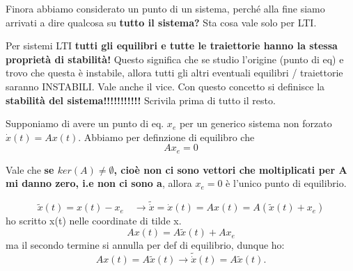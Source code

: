 \documentclass[a4paper]{report}
\begin{document}
\bb
Finora abbiamo considerato un punto di un sistema, perché alla fine siamo arrivati a dire qualcosa su \textbf{tutto il sistema?} Sta cosa vale solo per LTI.
\begin{defin}{}{}
Per sistemi LTI \textbf{tutti gli equilibri e tutte le traiettorie hanno la stessa proprietà di stabilità!} Questo significa che se studio l'origine (punto di eq) e trovo che questa è instabile, allora tutti gli altri eventuali equilibri / traiettorie saranno INSTABILI. Vale anche il vice. Con questo concetto si definisce la \textbf{stabilità del sistema!!!!!!!!!!!} Scrivila prima di tutto il resto.	
\end{defin}
\newpage
Supponiamo di avere un punto di eq. $x_e$ per un generico sistema non forzato $\dot x(t) = Ax(t)$.
Abbiamo per definzione di equilibro che 
\begin{equation*}
	A x_e = 0
\end{equation*}
\begin{defin}{}{}
Vale che \textbf{se $ker (A) \neq \emptyset$, cioè non ci sono vettori che moltiplicati per A mi danno zero, i.e non ci sono a}, allora $x_e = 0$ è l'unico punto di equilibrio.	
\end{defin}
\begin{equation*}
	\tilde x(t) = x(t) -x_e \quad \rightarrow \tilde{\dot x} = \dot x(t) = Ax(t) = A(\tilde x(t)+x_e)
\end{equation*}
ho scritto x(t) nelle coordinate di tilde x.
\begin{equation*}
	Ax(t) =A\tilde x(t)+ Ax_e
\end{equation*}
ma il secondo termine si annulla per def di equilibrio, dunque ho:
\begin{equation*}
	Ax(t) = A\tilde x(t) \rightarrow \tilde{\dot x}(t) = A \tilde x(t).
\end{equation*}
\end{document}

